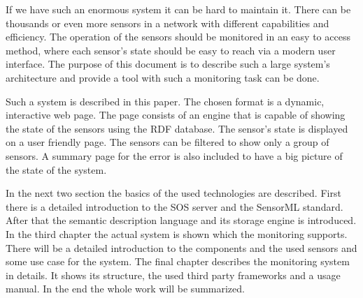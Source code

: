If we have such an enormous system it can be hard to maintain it. There can be thousands or even more sensors in a network with different capabilities and efficiency. The operation of the sensors should be monitored in an easy to access method, where each sensor's state should be easy to reach via a modern user interface. The purpose of this document is to describe such a large system's architecture and provide a tool with such a monitoring task can be done.

Such a system is described in this paper. The chosen format is a dynamic, interactive web page. The page consists of an engine that is capable of showing the state of the sensors using the RDF database. The sensor's state is displayed on a user friendly page. The sensors can be filtered to show only a group of sensors. A summary page for the error is also included to have a big picture of the state of the system. 

In the next two section the basics of the used technologies are described. First there is a detailed introduction to the SOS server and the SensorML standard. After that the semantic description language and its storage engine is introduced. 
In the third chapter the actual system is shown which the monitoring supports. 
There will be a detailed introduction to the components and the used sensors and some use case for the system. The final chapter describes the monitoring system in details. It shows its structure, the used third party frameworks and a usage manual. In the end the whole work will be summarized. 

